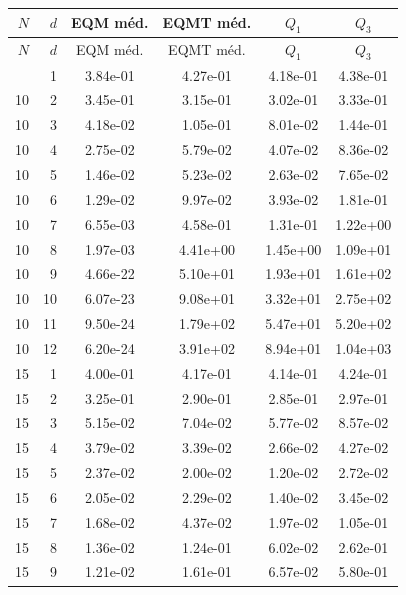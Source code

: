 \begin{longtable}{r r S[table-format=1.2e-2] S[table-format=1.2e-2] S[table-format=1.2e-2] S[table-format=1.2e-2]}
\toprule
{\(N\)} & {\(d\)} & {EQM m\'ed.} & {EQMT m\'ed.} & {\(Q_1\)} & {\(Q_3\)} \\
\midrule
\endfirsthead
\toprule
{\(N\)} & {\(d\)} & {EQM m\'ed.} & {EQMT m\'ed.} & {\(Q_1\)} & {\(Q_3\)} \\
\midrule
\endhead
\bottomrule
{} & 1 & 3.84e-01 & 4.27e-01 & 4.18e-01 & 4.38e-01 \\
10 & 2 & 3.45e-01 & 3.15e-01 & 3.02e-01 & 3.33e-01 \\
10 & 3 & 4.18e-02 & 1.05e-01 & 8.01e-02 & 1.44e-01 \\
10 & 4 & 2.75e-02 & 5.79e-02 & 4.07e-02 & 8.36e-02 \\
10 & 5 & 1.46e-02 & 5.23e-02 & 2.63e-02 & 7.65e-02 \\
10 & 6 & 1.29e-02 & 9.97e-02 & 3.93e-02 & 1.81e-01 \\
10 & 7 & 6.55e-03 & 4.58e-01 & 1.31e-01 & 1.22e+00 \\
10 & 8 & 1.97e-03 & 4.41e+00 & 1.45e+00 & 1.09e+01 \\
10 & 9 & 4.66e-22 & 5.10e+01 & 1.93e+01 & 1.61e+02 \\
10 & 10 & 6.07e-23 & 9.08e+01 & 3.32e+01 & 2.75e+02 \\
10 & 11 & 9.50e-24 & 1.79e+02 & 5.47e+01 & 5.20e+02 \\
10 & 12 & 6.20e-24 & 3.91e+02 & 8.94e+01 & 1.04e+03 \\
15 & 1 & 4.00e-01 & 4.17e-01 & 4.14e-01 & 4.24e-01 \\
15 & 2 & 3.25e-01 & 2.90e-01 & 2.85e-01 & 2.97e-01 \\
15 & 3 & 5.15e-02 & 7.04e-02 & 5.77e-02 & 8.57e-02 \\
15 & 4 & 3.79e-02 & 3.39e-02 & 2.66e-02 & 4.27e-02 \\
15 & 5 & 2.37e-02 & 2.00e-02 & 1.20e-02 & 2.72e-02 \\
15 & 6 & 2.05e-02 & 2.29e-02 & 1.40e-02 & 3.45e-02 \\
15 & 7 & 1.68e-02 & 4.37e-02 & 1.97e-02 & 1.05e-01 \\
15 & 8 & 1.36e-02 & 1.24e-01 & 6.02e-02 & 2.62e-01 \\
15 & 9 & 1.21e-02 & 1.61e-01 & 6.57e-02 & 5.80e-01 \\

\end{longtable}
